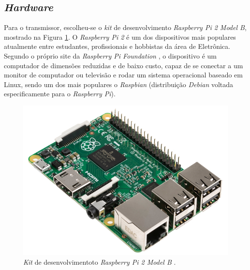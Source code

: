 \subsection{\textit{Hardware}}
Para o transmissor, escolheu-se o \textit{kit} de desenvolvimento \textit{Raspberry Pi 2 Model B}, mostrado na Figura \ref{fig:rasp}. O \textit{Raspberry Pi 2} é um dos dispositivos mais populares atualmente entre estudantes, profissionais e hobbistas da área de Eletrônica. Segundo o próprio site da \textit{Raspberry Pi Foundation} \cite{raspberryOrg}, o dispositivo é um computador de dimensões reduzidas e de baixo custo, capaz de se conectar a um monitor de computador ou televisão e  rodar um sistema operacional baseado em Linux, sendo um dos mais populares o \textit{Raspbian} (distribuição \textit{Debian} voltada especificamente para o \textit{Raspberry Pi}).

\begin{figure}[h]
	\centering
	\includegraphics[scale=.5]{figuras/rpi2b.jpg}
	\caption{ \textit{Kit} de desenvolvimentoto \textit{Raspberry Pi 2 Model B} \cite{element14}.}
	\label{fig:rasp}
\end{figure}

